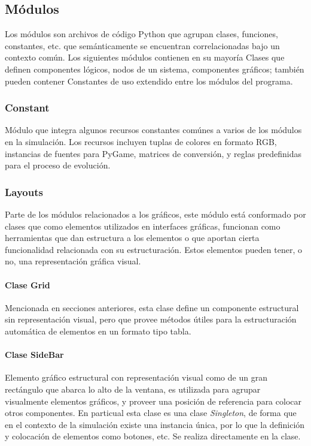 \documentclass[]{article}
\begin{document}
	\subsection{Módulos}
		Los módulos son archivos de código Python que agrupan clases, funciones, constantes, etc. que semánticamente se encuentran correlacionadas bajo un contexto común. Los siguientes módulos contienen en su mayoría Clases que definen componentes lógicos, nodos de un sistema, componentes gráficos; también pueden contener Constantes de uso extendido entre los módulos del programa.
		
		\subsubsection{Constant}
			Módulo que integra algunos recursos constantes comúnes a varios de los módulos en la simulación. Los recursos incluyen tuplas de colores en formato RGB, instancias de fuentes para PyGame, matrices de conversión, y reglas predefinidas para el proceso de evolución.
			
			
			
		\subsubsection{Layouts}
			Parte de los módulos relacionados a los gráficos, este módulo está conformado por clases que como elementos utilizados en interfaces gráficas, funcionan como herramientas que dan estructura a los elementos o que aportan cierta funcionalidad relacionada con su estructuración. Estos elementos pueden tener, o no, una representación gráfica visual.
			
			\paragraph{Clase Grid}
				Mencionada en secciones anteriores, esta clase define un componente estructural sin representación visual, pero que provee métodos útiles para la estructuración automática de elementos en un formato tipo tabla.
				
			\paragraph{Clase SideBar}
				Elemento gráfico estructural con representación visual como de un gran rectángulo que abarca lo alto de la ventana, es utilizada para agrupar visualmente elementos gráficos, y proveer una posición de referencia para colocar otros componentes. En particual esta clase es una clase \textit{Singleton}, de forma que en el contexto de la simulación existe una instancia única, por lo que la definición y colocación de elementos como botones, etc. Se realiza directamente en la clase.
				
\end{document}
